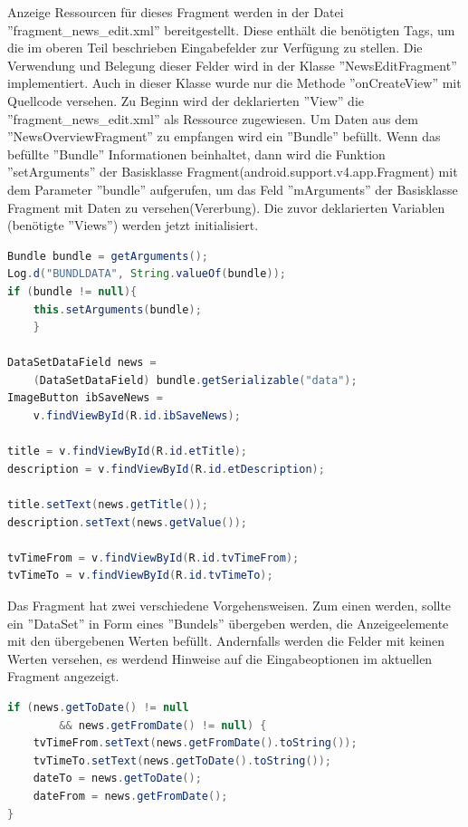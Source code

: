 Anzeige Ressourcen für dieses Fragment werden in der Datei ''fragment\_news\_edit.xml'' bereitgestellt. Diese enthält die benötigten Tags, um die im oberen Teil beschrieben Eingabefelder zur Verfügung zu stellen. Die Verwendung und Belegung dieser Felder wird in der Klasse ''NewsEditFragment'' implementiert. Auch in dieser Klasse wurde nur die Methode ''onCreateView'' mit Quellcode versehen. Zu Beginn wird der deklarierten ''View'' die ''fragment\_news\_edit.xml'' als Ressource zugewiesen. Um Daten aus dem ''NewsOverviewFragment'' zu empfangen wird ein ''Bundle'' befüllt. Wenn das befüllte ''Bundle'' Informationen beinhaltet, dann wird die Funktion ''setArguments'' der Basisklasse Fragment(android.support.v4.app.Fragment) mit dem Parameter ''bundle'' aufgerufen, um das Feld ''mArguments'' der Basisklasse Fragment mit Daten zu versehen(Vererbung). Die zuvor deklarierten Variablen (benötigte ''Views'') werden jetzt initialisiert.
\begin{lstlisting}[language=Java,caption={Übernahme der übergebenen Werte und initialisieren der Variablen im NewsEditFragment }]
Bundle bundle = getArguments();
Log.d("BUNDLDATA", String.valueOf(bundle));
if (bundle != null){
    this.setArguments(bundle);
    }
            
DataSetDataField news =
 	(DataSetDataField) bundle.getSerializable("data");
ImageButton ibSaveNews =
  	v.findViewById(R.id.ibSaveNews);
        
title = v.findViewById(R.id.etTitle);
description = v.findViewById(R.id.etDescription);

title.setText(news.getTitle());
description.setText(news.getValue());

tvTimeFrom = v.findViewById(R.id.tvTimeFrom);
tvTimeTo = v.findViewById(R.id.tvTimeTo);
\end{lstlisting}

Das Fragment hat zwei verschiedene Vorgehensweisen. Zum einen werden, sollte ein ''DataSet'' in Form eines ''Bundels'' übergeben werden, die Anzeigeelemente mit den übergebenen Werten befüllt. Andernfalls werden die Felder mit keinen Werten versehen, es werdend Hinweise auf die Eingabeoptionen im aktuellen Fragment angezeigt.

\begin{lstlisting}[language=Java,caption={Bedingung für Fragment-Recycling im NewsEditFragment}]
if (news.getToDate() != null 
		&& news.getFromDate() != null) {
    tvTimeFrom.setText(news.getFromDate().toString());
    tvTimeTo.setText(news.getToDate().toString());
    dateTo = news.getToDate();
    dateFrom = news.getFromDate();
}   
\end{lstlisting}

